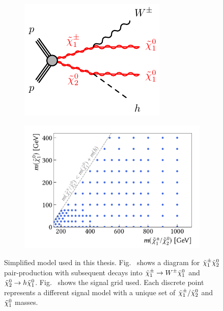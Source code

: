 
\begin{figure}
	\centering
	\begin{subfigure}[b]{0.45\linewidth}
		\centering\includegraphics[width=.85\textwidth]{C1N2-WhN1N1}
		\caption{\label{fig:Wh_model}}
	\end{subfigure}%
	\begin{subfigure}[b]{0.55\linewidth}
		\centering\includegraphics[width=.9\textwidth]{signalgrid}
		\caption{\label{fig:signalgrid}}
	\end{subfigure}	
	\caption{Simplified model used in this thesis. Fig.~ shows a diagram for $\tilde{\chi}_1^\pm\tilde{\chi}_2^0$ pair-production with subsequent decays into $\tilde{\chi}_1^\pm\rightarrow W^\pm\tilde{\chi}_1^0$ and $\tilde{\chi}_2^0\rightarrow h\tilde{\chi}_1^0$. Fig.~ shows the signal grid used. Each discrete point represents a different signal model with a unique set of $\tilde{\chi}_1^\pm/\tilde{\chi}_2^0$ and $\tilde{\chi}_1^0$ masses.}\label{fig:models_used}
\end{figure}

